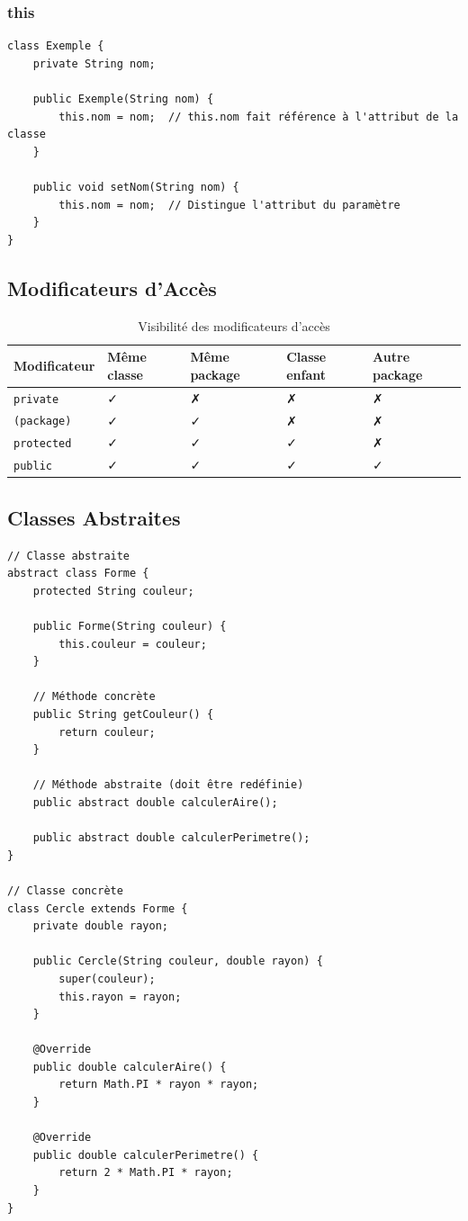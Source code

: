 \documentclass[11pt,a4paper]{article}
\begin{document}
\subsubsection{this}

\begin{lstlisting}
class Exemple {
    private String nom;
    
    public Exemple(String nom) {
        this.nom = nom;  // this.nom fait référence à l'attribut de la classe
    }
    
    public void setNom(String nom) {
        this.nom = nom;  // Distingue l'attribut du paramètre
    }
}
\end{lstlisting}

\subsection{Modificateurs d'Accès}

\begin{table}[h]
\centering
\begin{tabular}{|l|p{3cm}|p{3cm}|p{3cm}|p{3cm}|}
\hline
\textbf{Modificateur} & \textbf{Même classe} & \textbf{Même package} & \textbf{Classe enfant} & \textbf{Autre package} \\
\hline
\texttt{private} & ✓ & ✗ & ✗ & ✗ \\
\hline
\texttt{(package)} & ✓ & ✓ & ✗ & ✗ \\
\hline
\texttt{protected} & ✓ & ✓ & ✓ & ✗ \\
\hline
\texttt{public} & ✓ & ✓ & ✓ & ✓ \\
\hline
\end{tabular}
\caption{Visibilité des modificateurs d'accès}
\end{table}

\subsection{Classes Abstraites}

\begin{lstlisting}
// Classe abstraite
abstract class Forme {
    protected String couleur;
    
    public Forme(String couleur) {
        this.couleur = couleur;
    }
    
    // Méthode concrète
    public String getCouleur() {
        return couleur;
    }
    
    // Méthode abstraite (doit être redéfinie)
    public abstract double calculerAire();
    
    public abstract double calculerPerimetre();
}

// Classe concrète
class Cercle extends Forme {
    private double rayon;
    
    public Cercle(String couleur, double rayon) {
        super(couleur);
        this.rayon = rayon;
    }
    
    @Override
    public double calculerAire() {
        return Math.PI * rayon * rayon;
    }
    
    @Override
    public double calculerPerimetre() {
        return 2 * Math.PI * rayon;
    }
}
\end{lstlisting}
\end{document}
